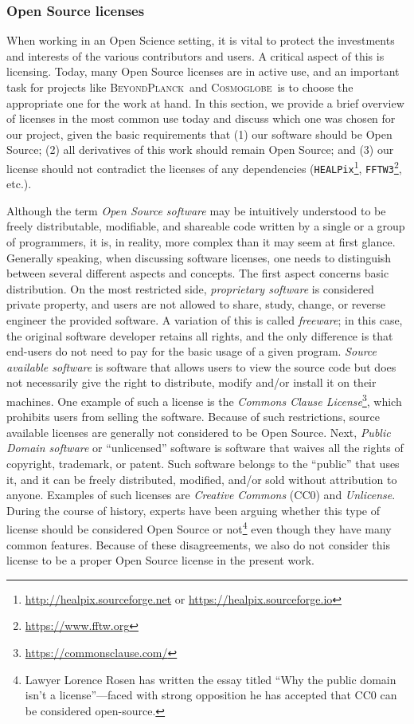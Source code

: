 \documentclass[twocolumn]{aa}
\newcommand{\BP}{\textsc{BeyondPlanck}}
\newcommand{\cosmoglobe}{\textsc{Cosmoglobe}}
\begin{document}
\subsubsection{Open Source licenses}

When working in an Open Science setting, it is vital to protect the investments and interests of the various contributors and users. A critical aspect of this is licensing. Today, many Open Source licenses are in active use, and an important task for projects like \BP\ and \cosmoglobe\ is to choose the appropriate one for the work at hand. In this section, we provide a brief overview of licenses in the most common use today and discuss which one was chosen for our project, given the basic requirements that (1) our software should be Open Source; (2) all derivatives of this work should remain Open Source; and (3) our license should not contradict the licenses of any dependencies (\texttt{HEALPix}\footnote{\url{http://healpix.sourceforge.net} or \url{https://healpix.sourceforge.io}}, \texttt{FFTW3}\footnote{\url{https://www.fftw.org}}, etc.).

Although the term \textit{Open Source software} may be intuitively understood to be freely distributable, modifiable, and shareable code written by a single or a group of programmers, it is, in reality, more complex than it may seem at first glance. Generally speaking, when discussing software licenses, one needs to distinguish between several different aspects and concepts. The first aspect concerns basic distribution. On the most restricted side, \emph{proprietary software} is considered private property, and users are not allowed to share, study, change, or reverse engineer the provided software. A variation of this is called \emph{freeware}; in this case, the original software developer retains all rights, and the only difference is that end-users do not need to pay for the basic usage of a given program. \textit{Source available software} is software that allows users to view the source code but does not necessarily give the right to distribute, modify and/or install it on their machines. One example of such a license is the \textit{Commons Clause License}\footnote{\url{https://commonsclause.com/}}, which prohibits users from selling the software. Because of such restrictions, source available licenses are generally not considered to be Open Source. Next, \textit{Public Domain software} or ``unlicensed'' software is software that waives all the rights of copyright, trademark, or patent. Such software belongs to the ``public'' that uses it, and it can be freely distributed, modified, and/or sold without attribution to anyone. Examples of such licenses are \textit{Creative Commons} (CC0) and \textit{Unlicense}. During the course of history, experts have been arguing whether this type of license should be considered Open Source or not\footnote{Lawyer Lorence Rosen has written the essay titled ``Why the public domain isn't a license''—faced with strong opposition he has accepted that CC0 can be considered open-source.} even though they have many common features. Because of these disagreements, we also do not consider this license to be a proper Open Source license in the present work.
\end{document}
